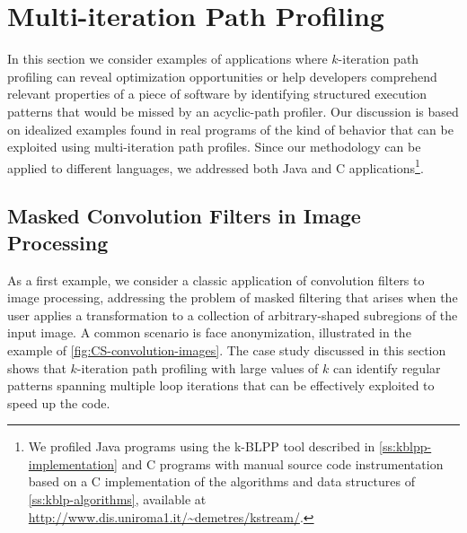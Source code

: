 
\section{Multi-iteration Path Profiling}
\label{se:kblpp-case-studies}
In this section we consider examples of applications where $k$-iteration path profiling can reveal optimization opportunities or help developers comprehend relevant properties of a piece of software by identifying structured execution patterns that would be missed by an acyclic-path profiler. Our discussion is based on idealized examples found in real programs of the kind of behavior that can be exploited using multi-iteration path profiles. Since our methodology can be applied to different languages, we addressed both Java and C applications\footnote{We profiled Java programs using the k-BLPP tool described in \mysection\ref{ss:kblpp-implementation} and C programs with manual source code instrumentation based on a C implementation of the algorithms and data structures of \mysection\ref{ss:kblp-algorithms}, available at \url{http://www.dis.uniroma1.it/~demetres/kstream/}. }.

\subsection{Masked Convolution Filters in Image Processing}
\label{ss:convolution}

As a first example, we consider a classic application of convolution filters to image processing, addressing the problem of masked filtering that arises when the user applies a transformation to a collection of arbitrary-shaped subregions of the input image. A common scenario is face anonymization, illustrated in the example of \myfigure\ref{fig:CS-convolution-images}. The case study discussed in this section shows that $k$-iteration path profiling with large values of $k$ can identify regular patterns spanning multiple loop iterations that can be effectively exploited to speed up the code.

